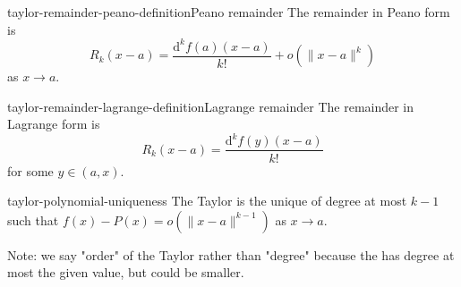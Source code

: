 \documentclass[preview]{standalone}
\begin{document}
\begin{snippetdefinition}{taylor-remainder-peano-definition}{Peano remainder}
    The remainder in Peano form is
    \[
        R_k(x - a) = \frac{\text{d}^k f(a)(x - a)}{k!} + o(\|x - a\|^k)
    \]
    as \(x \to a\).
\end{snippetdefinition}

\begin{snippetdefinition}{taylor-remainder-lagrange-definition}{Lagrange remainder}
    The remainder in Lagrange form is
    \[
        R_k(x - a) = \frac{\text{d}^k f(y)(x - a)}{k!}
    \]
    for some \(y \in (a, x)\).
\end{snippetdefinition}

\begin{snippet}{taylor-polynomial-uniqueness}
    The Taylor \polynomial is the unique \polynomial of degree at most \(k - 1\)
    such that \(f(x) - P(x) = o(\|x - a\|^{k-1})\) as \(x \to a\).
    
    Note: we say "order" of the Taylor \polynomial rather than "degree"
    because the \polynomial has degree at most the given value, but could be smaller.
\end{snippet}
\end{document}
